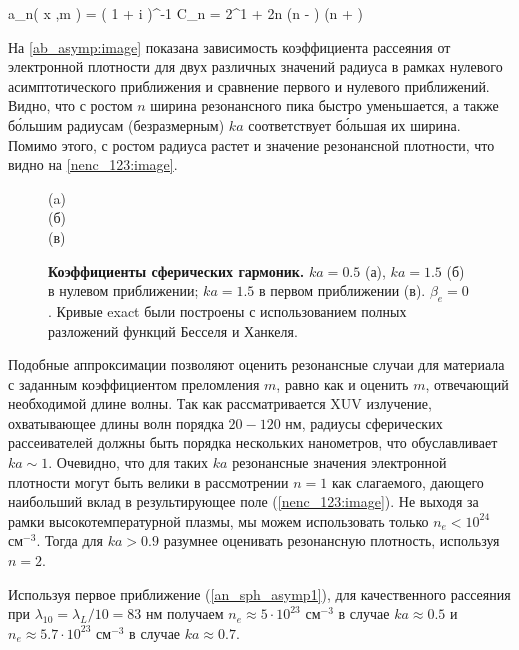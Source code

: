     \eq
		a_n\left( x ,\:m \right) = \left( 1 + i  \right)^{-1}
		\label{an_sph_asymp1}
	\qe
	\eqc
		C_n = 2^{1 + 2n} \Gamma(n - ) \Gamma(n + )
	\cqe

На \autoref{ab_asymp:image} показана зависимость коэффициента рассеяния от электронной плотности для двух различных значений радиуса в рамках нулевого асимптотического приближения и сравнение первого и нулевого приближений. Видно, что с ростом $n$ ширина резонансного пика быстро уменьшается, а также б\'{о}льшим радиусам (безразмерным) $ka$ соответствует б\'{о}льшая их ширина. Помимо этого, с ростом радиуса растет и значение резонансной плотности, что видно на \autoref{nenc_123:image}.

    \begin{figure}[ht]
		(a)\qquad {}
		\\ (б)\qquad {}
        \\ (в)\qquad {}
		\caption{\textbf{Коэффициенты сферических гармоник.} $ka = 0.5$ (а), $ka = 1.5$ (б) в нулевом приближении; $ka = 1.5$ в первом приближении (в). $\beta_e = 0$. Кривые exact были построены с использованием полных разложений функций Бесселя и Ханкеля.}
		\label{ab_asymp:image}
	\end{figure}


Подобные аппроксимации позволяют оценить резонансные случаи для материала с заданным коэффициентом преломления $m$, равно как и оценить $m$, отвечающий необходимой длине волны. Так как рассматривается XUV излучение, охватывающее длины волн порядка $20-120$ нм, радиусы сферических рассеивателей должны быть порядка нескольких нанометров, что обуславливает $ka \sim 1$. Очевидно, что для таких $ka$ резонансные значения электронной плотности могут быть велики в рассмотрении $n = 1$ как слагаемого, дающего наибольший вклад в результирующее поле (\autoref{nenc_123:image}). Не выходя за рамки высокотемпературной плазмы, мы можем использовать только $n_e < 10^{24}$ $\textrm{см}^{-3}$. Тогда для $ka > 0.9$ разумнее оценивать резонансную плотность, используя $n = 2$.

Используя первое приближение (\ref{an_sph_asymp1}), для качественного рассеяния при $\lambda_{10} = \lambda_{L} / 10 = 83$ нм получаем $n_e \approx 5 \cdot 10^{23}$ $\textrm{см}^{-3}$ в случае $ka \approx 0.5$ и $n_e \approx 5.7 \cdot 10^{23}$ $\textrm{см}^{-3}$ в случае $ka \approx 0.7$.





